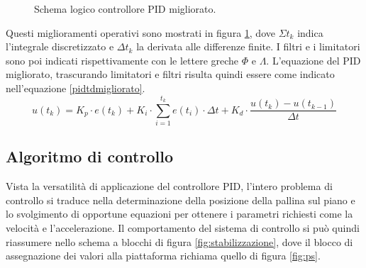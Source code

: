\documentclass[12pt,twoside,openright]{article}
\begin{document}
\begin{figure}[h!]
{
}
\caption{Schema logico controllore PID migliorato.} \label{fig:pidmigliorato}
\end{figure}
Questi miglioramenti operativi sono mostrati in figura \ref{fig:pidmigliorato}, dove $\Sigma{t_k}$ indica l'integrale discretizzato e $\Delta{t_k}$ la derivata alle differenze finite. I filtri e i limitatori sono poi indicati rispettivamente con le lettere greche $\Phi$ e $\Lambda$. L'equazione del PID migliorato, trascurando limitatori e filtri risulta quindi essere come indicato nell'equazione \eqref{pidtdmigliorato}.
\begin{equation}\label{pidtdmigliorato}
    u(t_k)=K_p \cdot e(t_k) + K_i \cdot \sum_{i=1}^{t_k} e(t_i)\cdot \Delta t + K_d\cdot \frac{u(t_k)-u(t_{k-1})}{\Delta t}
\end{equation}

\subsection{Algoritmo di controllo}
Vista la versatilità di applicazione del controllore PID, l'intero problema di controllo si traduce nella determinazione della posizione della pallina sul piano e lo svolgimento di opportune equazioni per ottenere i parametri richiesti come la velocità e l'accelerazione. Il comportamento del sistema di controllo si può quindi riassumere nello schema a blocchi di figura \ref{fig:stabilizzazione}, dove il blocco di assegnazione dei valori alla piattaforma richiama quello di figura \ref{fig:ps}.
\end{document}
